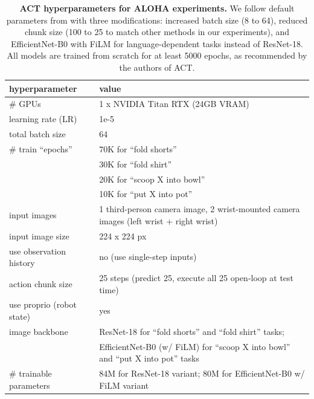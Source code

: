 \documentclass[conference]{IEEEtran}
\begin{document}
\begin{table}
\centering
\caption{\textbf{ACT hyperparameters for ALOHA experiments.} We follow default parameters from \citet{zhao2023learning} with three modifications: increased batch size (8 to 64), reduced chunk size (100 to 25 to match other methods in our experiments), and EfficientNet-B0 with FiLM \citep{perez2018film} for language-dependent tasks instead of ResNet-18. All models are trained from scratch for at least 5000 epochs, as recommended by the authors of ACT.}
\label{tab:act_hyperparameters_aloha}
\begin{tabular}{ll}
\toprule
hyperparameter & value \\
\midrule
\# GPUs & 1 x NVIDIA Titan RTX (24GB VRAM) \\
learning rate (LR) & 1e-5 \\
total batch size & 64 \\
\# train ``epochs'' & 70K for ``fold shorts'' \\
& 30K for ``fold shirt'' \\
& 20K for ``scoop X into bowl'' \\
& 10K for ``put X into pot'' \\
input images & 1 third-person camera image, 2 wrist-mounted camera images (left wrist + right wrist) \\
input image size & 224 x 224 px \\
use observation history & no (use single-step inputs) \\
action chunk size & 25 steps (predict 25, execute all 25 open-loop at test time) \\
use proprio (robot state) & yes \\
image backbone & ResNet-18 for ``fold shorts'' and ``fold shirt'' tasks; \\
& EfficientNet-B0 (w/ FiLM) for ``scoop X into bowl'' and ``put X into pot'' tasks \\
\# trainable parameters & 84M for ResNet-18 variant; 80M for EfficientNet-B0 w/ FiLM variant \\
\bottomrule
\end{tabular}
\end{table}
\end{document}
